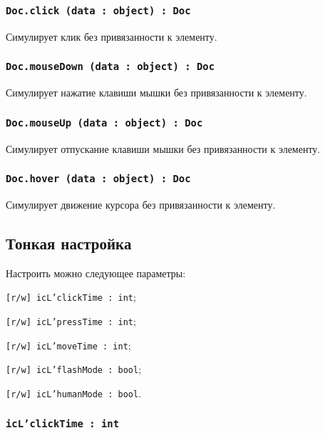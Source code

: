 \subsubsection{\texttt{Doc.click (data : object) : Doc}}

Симулирует клик без привязанности к элементу.

\subsubsection{\texttt{Doc.mouseDown (data : object) : Doc}}

Симулирует нажатие клавиши мышки без привязанности к элементу.

\subsubsection{\texttt{Doc.mouseUp (data : object) : Doc}}

Симулирует отпускание клавиши мышки без привязанности к элементу.

\subsubsection{\texttt{Doc.hover (data : object) : Doc}}

Симулирует движение курсора без привязанности к элементу.

\subsection{Тонкая настройка}

Настроить можно следующее параметры:
\begin{icItems}
	\item \texttt{[r/w] icL'clickTime : int};
	\item \texttt{[r/w] icL'pressTime : int};
	\item \texttt{[r/w] icL'moveTime : int};
	\item \texttt{[r/w] icL'flashMode : bool};
	\item \texttt{[r/w] icL'humanMode : bool}.
\end{icItems}

\subsubsection{\texttt{icL'clickTime : int}}

